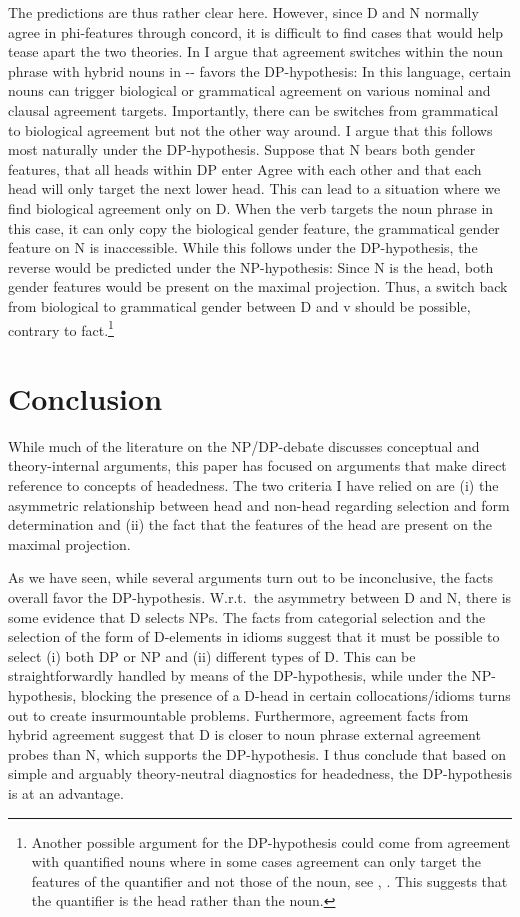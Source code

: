 \documentclass[output=paper,colorlinks,citecolor=black,
]{langscibook}
\begin{document}
The predictions are thus rather clear here. However, since D and N normally agree in phi-features through concord, it is difficult to find cases that would help tease apart the two theories. In \citet{Salzmann:2020:NP-DP} I argue that agreement switches within the noun phrase with hybrid nouns in -- favors the DP-hypothesis: In this language, certain nouns can trigger biological or grammatical agreement on various nominal and clausal agreement targets. Importantly, there can be switches from grammatical to biological agreement but not the other way around. I argue that this follows most naturally under the DP-hypothesis. Suppose that N bears both gender features, that all heads within DP enter Agree with each other and that each head will only target the next lower head. This can lead to a situation where we find biological agreement only on D. When the verb targets the noun phrase in this case, it can only copy the biological gender feature, the grammatical gender feature on N is inaccessible. While this follows under the DP-hypothesis, the reverse would be predicted under the NP-hypothesis: Since N is the head, both gender features would be present on the maximal projection. Thus, a switch back from biological to grammatical gender between D and v should be possible, contrary to fact.\footnote{Another possible argument for the DP-hypothesis could come from agreement with quantified nouns where in some cases agreement can only target the features of the quantifier and not those of the noun, see \citet{Danon:2013:AgreementAlternationQuantifiedNom}, \citet{Driemel-Stojkovic2019:AgreeQP}. This suggests that the quantifier is the head rather than the noun.}

\section{Conclusion}
\label{sec-conclusion}

While much of the literature on the NP/DP-debate discusses conceptual and theory-internal arguments, this paper has focused on arguments that make direct reference to concepts of headedness. The two criteria I have relied on are (i) the asymmetric relationship between head and non-head regarding selection and form determination and (ii) the fact that the features of the head are present on the maximal projection. 

As we have seen, while several arguments turn out to be inconclusive, the facts overall favor the
DP-hypothesis. W.r.t.\ the asymmetry between D and N, there is some evidence that D selects NPs. The
facts from categorial selection and the selection of the form of D-elements in idioms suggest that
it must be possible to select (i) both DP or NP and (ii) different types of D. This can be
straightforwardly handled by means of the DP-hypothesis, while under the NP-hypothesis, blocking the
presence of a D-head in certain collocations/idioms turns out to create insurmountable
problems. Furthermore, agreement facts from hybrid agreement suggest that D is closer to noun phrase
external agreement probes than N, which supports the DP-hypothesis. I thus conclude that based on
simple and arguably theory-neutral diagnostics for headedness, the DP-hypothesis is at an
advantage. 
\end{document}
